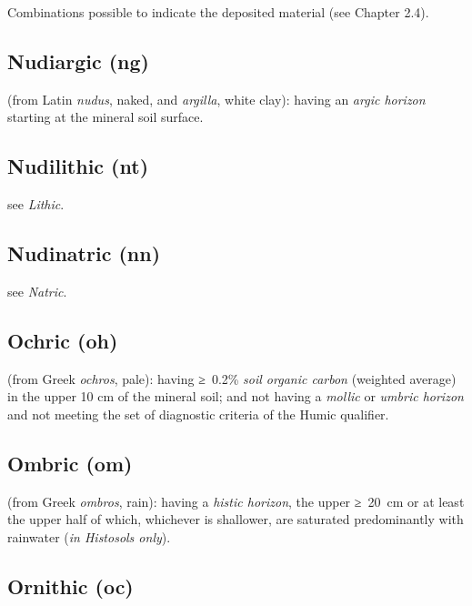 \documentclass[
  letterpaper,
  DIV=11,
  numbers=noendperiod]{scrreprt}
\begin{document}
Combinations possible to indicate the deposited material (see Chapter
2.4).

\hypertarget{nudiargic-ng}{%
\subsection{Nudiargic (ng)}\label{nudiargic-ng}}

(from Latin \emph{nudus}, naked, and \emph{argilla}, white clay): having
an \emph{argic horizon} starting at the mineral soil surface.

\hypertarget{nudilithic-nt-1}{%
\subsection{Nudilithic (nt)}\label{nudilithic-nt-1}}

see \emph{Lithic}.

\hypertarget{nudinatric-nn-1}{%
\subsection{Nudinatric (nn)}\label{nudinatric-nn-1}}

see \emph{Natric}.

\hypertarget{ochric-oh}{%
\subsection{Ochric (oh)}\label{ochric-oh}}

(from Greek \emph{ochros}, pale): having ≥~0.2\% \emph{soil organic
carbon} (weighted average) in the upper 10 cm of the mineral soil; and
not having a \emph{mollic} or \emph{umbric horizon} and not meeting the
set of diagnostic criteria of the Humic qualifier.

\hypertarget{ombric-om}{%
\subsection{Ombric (om)}\label{ombric-om}}

(from Greek \emph{ombros}, rain): having a \emph{histic horizon}, the
upper ≥~20~cm or at least the upper half of which, whichever is
shallower, are saturated predominantly with rainwater (\emph{in
Histosols only}).

\hypertarget{ornithic-oc}{%
\subsection{Ornithic (oc)}\label{ornithic-oc}}
\end{document}
